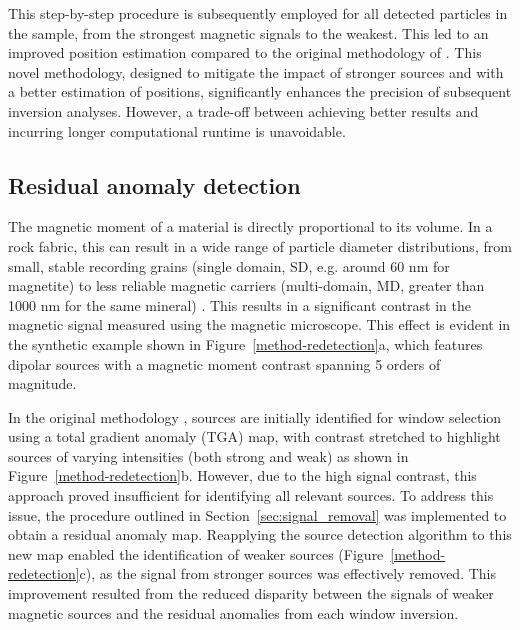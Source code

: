     This step-by-step procedure is subsequently employed for all detected particles in the sample, from the strongest magnetic signals to the weakest. This led to an improved position estimation compared to the original methodology of \citep{Souza-Junior2024}. This novel methodology, designed to mitigate the impact of stronger sources and with a better estimation of positions, significantly enhances the precision of subsequent inversion analyses. However, a trade-off between achieving better results and incurring longer computational runtime is unavoidable.

\subsection{Residual anomaly detection}

   The magnetic moment of a material is directly proportional to its volume. In a rock fabric, this can result in a wide range of particle diameter distributions, from small, stable recording grains (single domain, SD, e.g. around 60 nm for magnetite) to less reliable magnetic carriers (multi-domain, MD, greater than 1000 nm for the same mineral) \citep{Nagy2019}. This results in a significant contrast in the magnetic signal measured using the magnetic microscope. This effect is evident in the synthetic example shown in Figure~\ref{method-redetection}a, which features dipolar sources with a magnetic moment contrast spanning 5 orders of magnitude.

    In the original methodology \citep{Souza-Junior2024}, sources are initially identified for window selection using a total gradient anomaly (TGA) map, with contrast stretched to highlight sources of varying intensities (both strong and weak) as shown in Figure~\ref{method-redetection}b. However, due to the high signal contrast, this approach proved insufficient for identifying all relevant sources. To address this issue, the procedure outlined in Section~\ref{sec:signal_removal} was implemented to obtain a residual anomaly map. Reapplying the source detection algorithm to this new map enabled the identification of weaker sources (Figure~\ref{method-redetection}c), as the signal from stronger sources was effectively removed. This improvement resulted from the reduced disparity between the signals of weaker magnetic sources and the residual anomalies from each window inversion.

